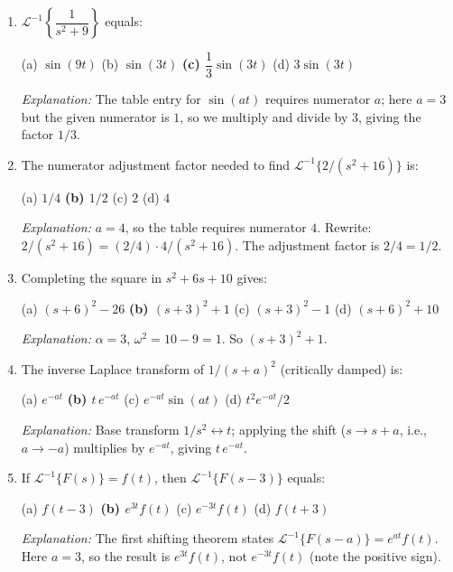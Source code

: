 \documentclass[12pt,a4paper]{article}
\begin{document}
\begin{enumerate}[leftmargin=*, label=\textbf{MCQ \arabic*.}]

\item $\mathcal{L}^{-1}\!\left\{\dfrac{1}{s^2+9}\right\}$ equals:

(a) $\sin(9t)$ \quad
(b) $\sin(3t)$ \quad
\textbf{(c) $\dfrac{1}{3}\sin(3t)$} \quad
(d) $3\sin(3t)$

\textit{Explanation:} The table entry for $\sin(at)$ requires numerator $a$; here $a=3$ but
the given numerator is $1$, so we multiply and divide by $3$, giving the factor $1/3$.

\item The numerator adjustment factor needed to find
$\mathcal{L}^{-1}\{2/(s^2+16)\}$ is:

(a) $1/4$ \quad
\textbf{(b) $1/2$} \quad
(c) $2$ \quad
(d) $4$

\textit{Explanation:} $a = 4$, so the table requires numerator $4$.
Rewrite: $2/(s^2+16) = (2/4)\cdot 4/(s^2+16)$. The adjustment factor is $2/4 = 1/2$.

\item Completing the square in $s^2 + 6s + 10$ gives:

(a) $(s+6)^2 - 26$ \quad
\textbf{(b) $(s+3)^2 + 1$} \quad
(c) $(s+3)^2 - 1$ \quad
(d) $(s+6)^2 + 10$

\textit{Explanation:} $\alpha = 3$, $\omega^2 = 10 - 9 = 1$. So $(s+3)^2 + 1$.

\item The inverse Laplace transform of $1/(s+a)^2$ (critically damped) is:

(a) $e^{-at}$ \quad
\textbf{(b) $t\,e^{-at}$} \quad
(c) $e^{-at}\sin(at)$ \quad
(d) $t^2 e^{-at}/2$

\textit{Explanation:} Base transform $1/s^2 \leftrightarrow t$; applying the shift
($s \to s+a$, i.e., $a \to -a$) multiplies by $e^{-at}$, giving $t\,e^{-at}$.

\item If $\mathcal{L}^{-1}\{F(s)\} = f(t)$, then $\mathcal{L}^{-1}\{F(s-3)\}$ equals:

(a) $f(t-3)$ \quad
\textbf{(b) $e^{3t}f(t)$} \quad
(c) $e^{-3t}f(t)$ \quad
(d) $f(t+3)$

\textit{Explanation:} The first shifting theorem states $\mathcal{L}^{-1}\{F(s-a)\} = e^{at}f(t)$.
Here $a = 3$, so the result is $e^{3t}f(t)$, not $e^{-3t}f(t)$ (note the positive sign).

\end{enumerate}
\end{document}
